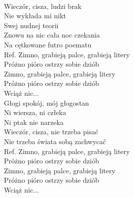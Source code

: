 
\tab{}\tab{}\\
Wieczór, cisza, ludzi brak \tab{}\\
Nie wykłada mi nikt \tab{}\\
Swej nudnej teorii \tab{}\\
Znowu na nic cała noc czekania  \\
Na cętkowane futro poematu \tab{}\\
\hops
Ref. Zimno, grabieją palce, grabieją litery \\
 Próżno pióro ostrzy sobie dziób \\
 Zimno, grabieją palce, grabieją litery \\
 Próżno pióro ostrzy sobie dziób \\
 Wciąż nic... \\
\hops
Głogi spokój, mój głogostan \\
Ni wiersza, ni człeka \\
Ni ptak nie narzeka \\
Wieczór, cisza, nie trzeba pisać \\
Nie trzeba świata sobą zachwycać \\
\hops
Ref. Zimno, grabieją palce, grabieją litery \\
 Próżno pióro ostrzy sobie dziób \\
 Zimno, grabieją palce, grabieją litery \\
 Próżno pióro ostrzy sobie dziób \\
 Wciąż nic...